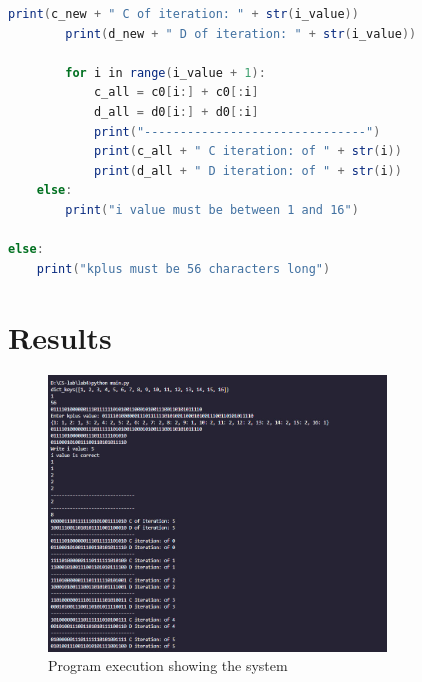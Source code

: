 \documentclass[12pt]{article}
\begin{document}
\begin{lstlisting}[language=Java]
        print(c_new + " C of iteration: " + str(i_value))
        print(d_new + " D of iteration: " + str(i_value))

        for i in range(i_value + 1):
            c_all = c0[i:] + c0[:i]
            d_all = d0[i:] + d0[:i]
            print("-------------------------------")
            print(c_all + " C iteration: of " + str(i))
            print(d_all + " D iteration: of " + str(i))
    else:
        print("i value must be between 1 and 16")

else:
    print("kplus must be 56 characters long")

    \end{lstlisting}

\section*{Results}
\hspace{0.8cm}

\begin{figure}[H]
    \centering
    \includegraphics[width=0.8\textwidth]{img/das.jpg}  %
    \caption{Program execution showing the system}
    \label{fig:example}
\end{figure}




\end{document}
